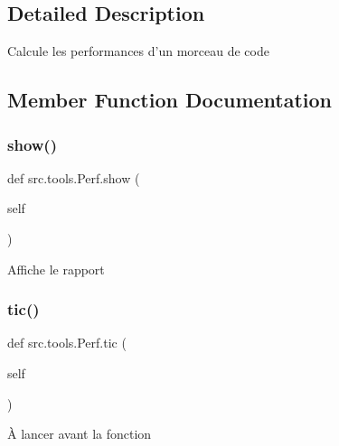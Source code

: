 \subsection{Detailed Description}
\begin{DoxyVerb}Calcule les performances d'un morceau de code \end{DoxyVerb}
 

\subsection{Member Function Documentation}
\hypertarget{classsrc_1_1tools_1_1_perf_a288e73eef3613d368a5def35b5563640}{}\label{classsrc_1_1tools_1_1_perf_a288e73eef3613d368a5def35b5563640} 
\subsubsection{\texorpdfstring{show()}{show()}}
{\footnotesize\ttfamily def src.\+tools.\+Perf.\+show (\begin{DoxyParamCaption}\item[{}]{self }\end{DoxyParamCaption})}

\begin{DoxyVerb}Affiche le rapport \end{DoxyVerb}
 \hypertarget{classsrc_1_1tools_1_1_perf_a0b7baa6b93ea6c10a7df605604aba102}{}\label{classsrc_1_1tools_1_1_perf_a0b7baa6b93ea6c10a7df605604aba102} 
\subsubsection{\texorpdfstring{tic()}{tic()}}
{\footnotesize\ttfamily def src.\+tools.\+Perf.\+tic (\begin{DoxyParamCaption}\item[{}]{self }\end{DoxyParamCaption})}

\begin{DoxyVerb}À lancer avant la fonction \end{DoxyVerb}
 \hypertarget{classsrc_1_1tools_1_1_perf_a0c94a91dbe6e8096218c3ade8693e668}{}\label{classsrc_1_1tools_1_1_perf_a0c94a91dbe6e8096218c3ade8693e668} 
